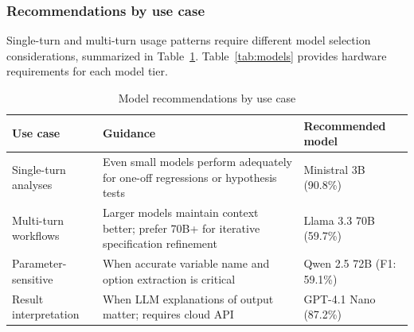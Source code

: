 \subsubsection{Recommendations by use case}

Single-turn and multi-turn usage patterns require different model selection
considerations, summarized in Table~\ref{tab:use-case-recs}.
Table~\ref{tab:models} provides hardware requirements for each model tier.

\begin{table}[htbp]
\centering
\begin{threeparttable}
\caption{Model recommendations by use case}
\label{tab:use-case-recs}
\small
\begin{tabular}{lp{5.5cm}l}
\toprule
Use case & Guidance & Recommended model \\
\midrule
Single-turn analyses & Even small models perform adequately for one-off regressions or hypothesis tests & Ministral 3B (90.8\%) \\
Multi-turn workflows & Larger models maintain context better; prefer 70B+ for iterative specification refinement & Llama 3.3 70B (59.7\%) \\
Parameter-sensitive & When accurate variable name and option extraction is critical & Qwen 2.5 72B (F1: 59.1\%) \\
Result interpretation & When LLM explanations of output matter; requires cloud API & GPT-4.1 Nano (87.2\%) \\
\bottomrule
\end{tabular}
\end{threeparttable}
\end{table}

